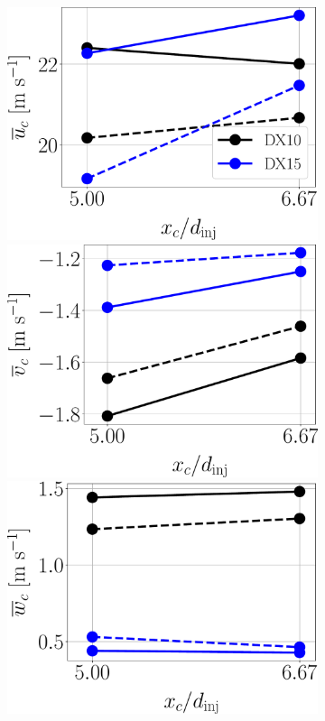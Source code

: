 \begin{figure}[ht]
\flushleft
\begin{subfigure}[b]{1.1\textwidth}
	\flushleft
   \includegraphics[scale=0.25]{./part3_applications/figures_ch8_resolved/SPRAY_characterization/velocities/ux_mean}
   \includegraphics[scale=0.25]{./part3_applications/figures_ch8_resolved/SPRAY_characterization/velocities/uy_mean}
   \includegraphics[scale=0.25]{./part3_applications/figures_ch8_resolved/SPRAY_characterization/velocities/uz_mean}

\end{subfigure}
\end{figure}
